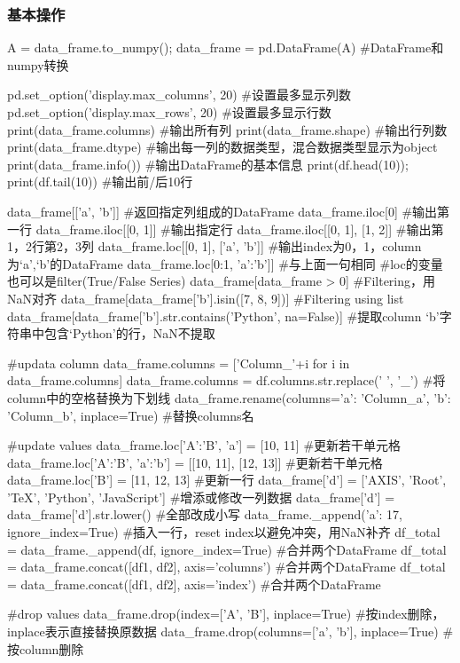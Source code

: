     \subsubsection{基本操作}
      \begin{codeblock}[language=python, caption={Basic functions about DataFrame}]
        A = data_frame.to_numpy(); data_frame = pd.DataFrame(A) #DataFrame和numpy转换

        pd.set_option('display.max_columns', 20) #设置最多显示列数
        pd.set_option('display.max_rows', 20) #设置最多显示行数
        print(data_frame.columns) #输出所有列
        print(data_frame.shape) #输出行列数
        print(data_frame.dtype) #输出每一列的数据类型，混合数据类型显示为object
        print(data_frame.info()) #输出DataFrame的基本信息
        print(df.head(10)); print(df.tail(10)) #输出前/后10行

        data_frame[['a', 'b']] #返回指定列组成的DataFrame
        data_frame.iloc[0] #输出第一行
        data_frame.iloc[[0, 1]] #输出指定行
        data_frame.iloc[[0, 1], [1, 2]] #输出第1，2行第2，3列
        data_frame.loc[[0, 1], ['a', 'b']] #输出index为0，1，column为`a',`b'的DataFrame
        data_frame.loc[0:1, 'a':'b']] #与上面一句相同
            #loc的变量也可以是filter(True/False Series)
        data_frame[data_frame > 0] #Filtering，用NaN对齐
        data_frame[data_frame['b'].isin([7, 8, 9])] #Filtering using list
        data_frame[data_frame['b'].str.contains('Python', na=False)] 
            #提取column `b'字符串中包含`Python'的行，NaN不提取

        #updata column
        data_frame.columns = ['Column_'+i for i in data_frame.columns]
        data_frame.columns = df.columns.str.replace(' ', '_') #将column中的空格替换为下划线
        data_frame.rename(columns={'a': 'Column_a', 'b': 'Column_b'}, inplace=True) #替换columns名

        #update values
        data_frame.loc['A':'B', 'a'] = [10, 11] #更新若干单元格
        data_frame.loc['A':'B', 'a':'b'] = [[10, 11], [12, 13]] #更新若干单元格
        data_frame.loc['B'] = [11, 12, 13] #更新一行
        data_frame['d'] = ['AXIS', 'Root', 'TeX', 'Python', 'JavaScript'] #增添或修改一列数据
        data_frame['d'] = data_frame['d'].str.lower() #全部改成小写
        data_frame._append({'a': 17}, ignore_index=True) #插入一行，reset index以避免冲突，用NaN补齐
        df_total = data_frame._append(df, ignore_index=True) #合并两个DataFrame
        df_total = data_frame.concat([df1, df2], axis='columns') #合并两个DataFrame
        df_total = data_frame.concat([df1, df2], axis='index') #合并两个DataFrame

        #drop values
        data_frame.drop(index=['A', 'B'], inplace=True) #按index删除，inplace表示直接替换原数据
        data_frame.drop(columns=['a', 'b'], inplace=True) #按column删除
      \end{codeblock}

